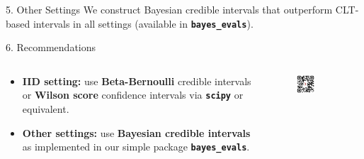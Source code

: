 \documentclass[final]{beamer}
\newlength{\colwidth}
\begin{document}
\begin{frame}[fragile]
\begin{columns}[t]
\begin{column}{\colwidth}
\begin{exampleblock}{5. Other Settings}
    We construct Bayesian credible intervals that outperform CLT-based intervals in all settings (available in \textbf{\texttt{bayes\_evals}}).

  \end{exampleblock}


  \vspace{-0.75em}
  \begin{alertblock}{6. Recommendations}
    
    \begin{columns}
      \begin{column}{0.7\textwidth}

        \begin{itemize}
          \item \textbf{IID setting:} use \textbf{Beta-Bernoulli} credible intervals or \textbf{Wilson score} confidence intervals via \textbf{\texttt{scipy}} or equivalent.
          
          \item \textbf{Other settings:} use \textbf{Bayesian credible intervals} as implemented in our simple package \textbf{\texttt{bayes\_evals}}.
        \end{itemize}
      \end{column}
      \begin{column}{0.3\textwidth}
        \vspace{1em}
        \begin{figure}
          \centering
          \includegraphics[width=0.5\textwidth]{fig/arxiv_qr.png}
        \end{figure}

        \vspace{0.5em}
      

\end{column}
\end{columns}
\end{alertblock}
\end{column}
\end{columns}
\end{frame}
\end{document}
